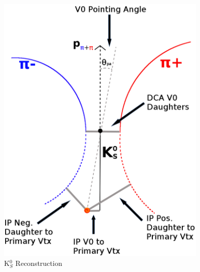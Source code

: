 \documentclass[../AnalysisNoteJBuxton.tex]{subfiles}
\begin{document}
\begin{figure}[h]
  \centering
  \includegraphics[width=100mm]{3_DataSelection/Figures/K0Cuts.pdf}
  \caption[K$^{0}_{S}$ Reconstruction]{K$^{0}_{S}$ Reconstruction}
  \label{fig:K0Reconstruction}
\end{figure}
\end{document}
